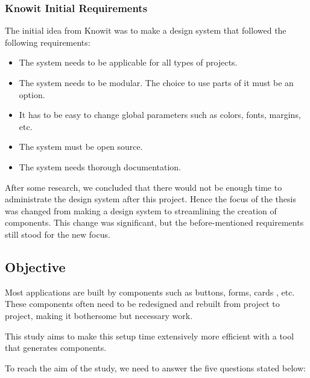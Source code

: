 \subsubsection{Knowit Initial Requirements}%
\label{ssub:Knowit Initial Requirements}
The initial idea from Knowit was to make a design system \cite{fanguyComprehensiveGuideDesign} that followed the following requirements:
\begin{itemize}
  \item The system needs to be applicable for all types of projects.
  \item The system needs to be modular. The choice to use parts of it must be an option.
  \item It has to be easy to change global parameters such as colors, fonts, margins, etc.
  \item The system must be open source.
  \item The system needs thorough documentation.
\end{itemize}

After some research, we concluded that there would not be enough time to administrate the design system after this project. Hence the focus of the thesis was changed from making a design system to streamlining the creation of \glspl{component}. This change was significant, but the before-mentioned requirements still stood for the new focus. 




\subsection{Objective}
\label{sub:Objective}
Most applications are built by \glspl{component} such as buttons, forms, cards \cite{babichSimpleDesignTips2020}, etc. These \glspl{component} often need to be redesigned and rebuilt from project to project, making it bothersome but necessary work. 

This study aims to make this setup time extensively more efficient with a tool that generates \glspl{component}. 

To reach the aim of the study, we need to answer the five questions stated below:  

